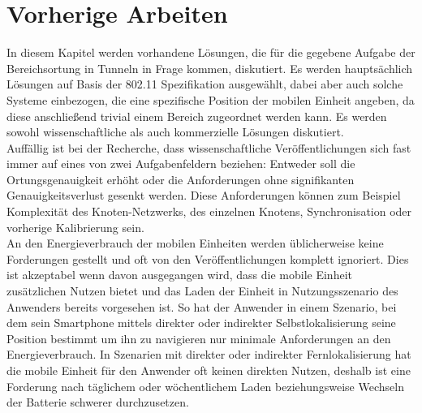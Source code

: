 
\chapter{Vorherige Arbeiten}
\label{ch:Vorherige}
In diesem Kapitel werden vorhandene Lösungen, die für die gegebene Aufgabe der Bereichsortung in Tunneln in Frage kommen, diskutiert. 
Es werden hauptsächlich Lösungen auf Basis der 802.11 Spezifikation ausgewählt, dabei aber auch solche Systeme einbezogen, die eine spezifische Position der mobilen Einheit angeben, da diese anschließend trivial einem Bereich zugeordnet werden kann. 
Es werden sowohl wissenschaftliche als auch kommerzielle Lösungen diskutiert.\\
Auffällig ist bei der Recherche, dass wissenschaftliche Veröffentlichungen sich fast immer auf eines von zwei Aufgabenfeldern beziehen: Entweder soll die Ortungsgenauigkeit erhöht oder die Anforderungen ohne signifikanten Genauigkeitsverlust gesenkt werden. 
Diese Anforderungen können zum Beispiel Komplexität des Knoten-Netzwerks, des einzelnen Knotens, Synchronisation oder vorherige Kalibrierung sein.\\
An den Energieverbrauch der mobilen Einheiten werden üblicherweise keine Forderungen gestellt und oft von den Veröffentlichungen komplett ignoriert.
Dies ist akzeptabel wenn davon ausgegangen wird, dass die mobile Einheit zusätzlichen Nutzen bietet und das Laden der Einheit in Nutzungsszenario des Anwenders bereits vorgesehen ist.
So hat der Anwender in einem Szenario, bei dem sein Smartphone mittels direkter oder indirekter Selbstlokalisierung seine Position bestimmt um ihn zu navigieren nur minimale Anforderungen an den Energieverbrauch.
In Szenarien mit direkter oder indirekter Fernlokalisierung hat die mobile Einheit für den Anwender oft keinen direkten Nutzen, deshalb ist eine Forderung nach täglichem oder wöchentlichem Laden beziehungsweise Wechseln der Batterie schwerer durchzusetzen.\\






